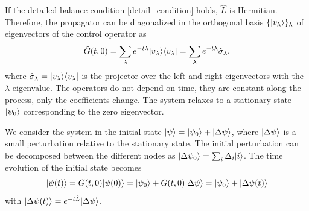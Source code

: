 If the detailed balance condition \eqref{detail_condition} holds, $\hat L$ is Hermitian. Therefore, the propagator can be diagonalized in the orthogonal basis $\{\lvert v_\lambda\rangle\}_\lambda$ of eigenvectors of the control operator as
\begin{equation}\label{diagonal_propagator}
    \hat G(t,0) = \sum_\lambda e^{-t\lambda} \lvert v_\lambda\rangle\langle v_\lambda\rvert = \sum_\lambda e^{-t\lambda} \hat \sigma_\lambda,
\end{equation}
where $\hat \sigma_\lambda = \lvert v_\lambda\rangle\langle v_\lambda\rvert$ is the projector over the left and right eigenvectors with the $\lambda$ eigenvalue. The operators do not depend on time, they are constant along the process, only the coefficients change.
The system relaxes to a stationary state $\lvert\psi_0\rangle$ corresponding to the zero eigenvector.

We consider the system in the initial state $\lvert\psi\rangle = \lvert\psi_0\rangle + \lvert\Delta\psi\rangle$, where $\lvert\Delta\psi\rangle$ is a small perturbation relative to the stationary state. The initial perturbation can be decomposed between the different nodes as $\lvert\Delta\psi_0\rangle = \sum_i \Delta_i \lvert i\rangle$.
The time evolution of the initial state becomes
\begin{equation}
    \lvert\psi(t)\rangle = G(t,0) \lvert\psi(0)\rangle = \lvert\psi_0\rangle + G(t,0)\lvert\Delta\psi\rangle = \lvert\psi_0\rangle + \lvert\Delta\psi(t)\rangle
\end{equation}
with $\lvert\Delta\psi(t)\rangle = e^{-t\hat L} \lvert\Delta \psi\rangle$.

